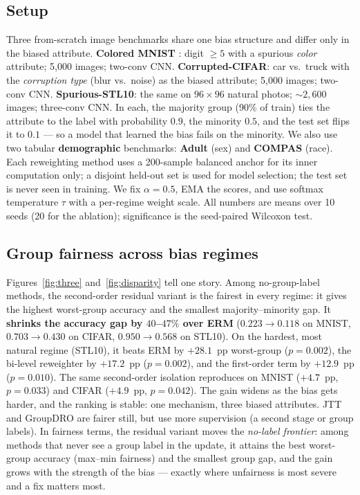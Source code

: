 \documentclass[letterpaper]{article}
\begin{document}
\subsection{Setup}
\label{sec:setup}
Three from-scratch image benchmarks share one bias structure and differ only in
the biased attribute. \textbf{Colored MNIST} \citep{arjovsky2019irm}: digit
${\geq}5$ with a spurious \emph{color} attribute; 5{,}000 images; two-conv CNN.
\textbf{Corrupted-CIFAR}: car vs.\ truck with the \emph{corruption type} (blur
vs.\ noise) as the biased attribute; 5{,}000 images; two-conv CNN.
\textbf{Spurious-STL10}: the same on $96{\times}96$ natural photos; ${\sim}2{,}600$
images; three-conv CNN. In each, the majority group (90\% of train) ties the
attribute to the label with probability $0.9$, the minority $0.5$, and the test
set flips it to $0.1$ --- so a model that learned the bias fails on the minority.
We also use two tabular \textbf{demographic} benchmarks: \textbf{Adult} (sex) and
\textbf{COMPAS} (race). Each reweighting method uses a 200-sample balanced anchor
for its inner computation only; a disjoint held-out set is used for model
selection; the test set is never seen in training. We fix $\alpha{=}0.5$, EMA the
scores, and use softmax temperature $\tau$ with a per-regime weight scale. All
numbers are means over 10 seeds (20 for the ablation); significance is the
seed-paired Wilcoxon test.

\subsection{Group fairness across bias regimes}
\label{sec:regimes}
Figures~\ref{fig:three} and~\ref{fig:disparity} tell one story. Among
no-group-label methods, the second-order residual variant is the fairest in every
regime: it gives the highest worst-group accuracy and the smallest
majority--minority gap. It \textbf{shrinks the accuracy gap by $40$--$47\%$ over
ERM} ($0.223{\to}0.118$ on MNIST, $0.703{\to}0.430$ on CIFAR, $0.950{\to}0.568$ on
STL10). On the hardest, most natural regime (STL10), it beats ERM by $+28.1$~pp
worst-group ($p{=}0.002$), the bi-level reweighter by $+17.2$~pp ($p{=}0.002$),
and the first-order term by $+12.9$~pp ($p{=}0.010$). The same second-order
isolation reproduces on MNIST ($+4.7$~pp, $p{=}0.033$) and CIFAR ($+4.9$~pp,
$p{=}0.042$). The gain widens as the bias gets harder, and the ranking is stable:
one mechanism, three biased attributes. JTT and GroupDRO are fairer still, but use
more supervision (a second stage or group labels). In fairness terms, the residual variant moves
the \emph{no-label frontier}: among methods that never see a group label in the
update, it attains the best worst-group accuracy (max--min fairness) and the
smallest group gap, and the gain grows with the strength of the bias --- exactly
where unfairness is most severe and a fix matters most.
\end{document}

